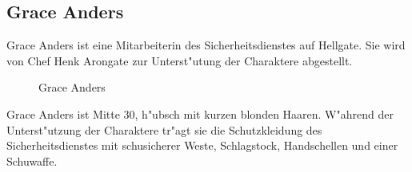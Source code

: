 \newpage
\subsection{Grace Anders}

Grace Anders ist eine Mitarbeiterin des Sicherheitsdienstes auf Hellgate. Sie wird von Chef Henk Arongate zur Unterst"utung der Charaktere abgestellt. 

\begin{figure}
    \caption{Grace Anders}
\end{figure}

Grace Anders ist Mitte 30, h"ubsch mit kurzen blonden Haaren. W"ahrend der Unterst"utzung der Charaktere tr"agt sie die Schutzkleidung des Sicherheitsdienstes mit schu\3sicherer Weste, Schlagstock, Handschellen und einer Schu\3waffe. 

